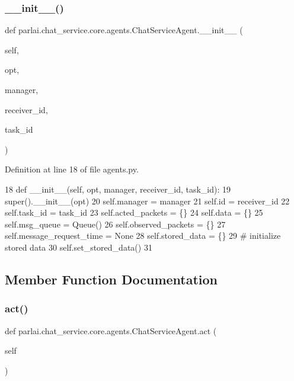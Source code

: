 \subsubsection{\texorpdfstring{\+\_\+\+\_\+init\+\_\+\+\_\+()}{\_\_init\_\_()}}
{\footnotesize\ttfamily def parlai.\+chat\+\_\+service.\+core.\+agents.\+Chat\+Service\+Agent.\+\_\+\+\_\+init\+\_\+\+\_\+ (\begin{DoxyParamCaption}\item[{}]{self,  }\item[{}]{opt,  }\item[{}]{manager,  }\item[{}]{receiver\+\_\+id,  }\item[{}]{task\+\_\+id }\end{DoxyParamCaption})}



Definition at line 18 of file agents.\+py.


\begin{DoxyCode}
18     \textcolor{keyword}{def }\_\_init\_\_(self, opt, manager, receiver\_id, task\_id):
19         super().\_\_init\_\_(opt)
20         self.manager = manager
21         self.id = receiver\_id
22         self.task\_id = task\_id
23         self.acted\_packets = \{\}
24         self.data = \{\}
25         self.msg\_queue = Queue()
26         self.observed\_packets = \{\}
27         self.message\_request\_time = \textcolor{keywordtype}{None}
28         self.stored\_data = \{\}
29         \textcolor{comment}{# initialize stored data}
30         self.set\_stored\_data()
31 
\end{DoxyCode}


\subsection{Member Function Documentation}
\mbox{\label{classparlai_1_1chat__service_1_1core_1_1agents_1_1ChatServiceAgent_afbb942bd61c840d55354e5cfea6a1f4d}} 
\subsubsection{\texorpdfstring{act()}{act()}}
{\footnotesize\ttfamily def parlai.\+chat\+\_\+service.\+core.\+agents.\+Chat\+Service\+Agent.\+act (\begin{DoxyParamCaption}\item[{}]{self }\end{DoxyParamCaption})}

